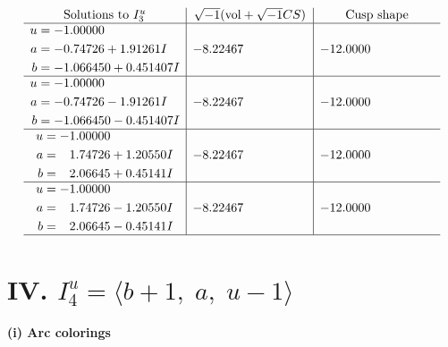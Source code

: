 \documentclass[1p]{elsarticle_modified}
\theoremstyle{definition}
\newcommand{\I}{\sqrt{-1}}
\begin{document}
$$\begin{array}{c|c|c}  
\text{Solutions to }I^u_{3}& \I (\text{vol} + \sqrt{-1}CS) & \text{Cusp shape}\\
 \hline 
\begin{aligned}
u &= -1.00000\phantom{ +0.000000I} \\
a &= -0.74726 + 1.91261 I \\
b &= -1.066450 + 0.451407 I\end{aligned}
 & -8.22467\phantom{ +0.000000I} & -12.0000\phantom{ +0.000000I} \\ \hline\begin{aligned}
u &= -1.00000\phantom{ +0.000000I} \\
a &= -0.74726 - 1.91261 I \\
b &= -1.066450 - 0.451407 I\end{aligned}
 & -8.22467\phantom{ +0.000000I} & -12.0000\phantom{ +0.000000I} \\ \hline\begin{aligned}
u &= -1.00000\phantom{ +0.000000I} \\
a &= \phantom{-}1.74726 + 1.20550 I \\
b &= \phantom{-}2.06645 + 0.45141 I\end{aligned}
 & -8.22467\phantom{ +0.000000I} & -12.0000\phantom{ +0.000000I} \\ \hline\begin{aligned}
u &= -1.00000\phantom{ +0.000000I} \\
a &= \phantom{-}1.74726 - 1.20550 I \\
b &= \phantom{-}2.06645 - 0.45141 I\end{aligned}
 & -8.22467\phantom{ +0.000000I} & -12.0000\phantom{ +0.000000I}\\
 \hline 
 \end{array}$$\newpage\newpage\renewcommand{\arraystretch}{1}
\centering \section*{IV. $I^u_{4}= \langle b+1,\;a,\;u-1 \rangle$}
\flushleft \textbf{(i) Arc colorings}\\
\end{document}
